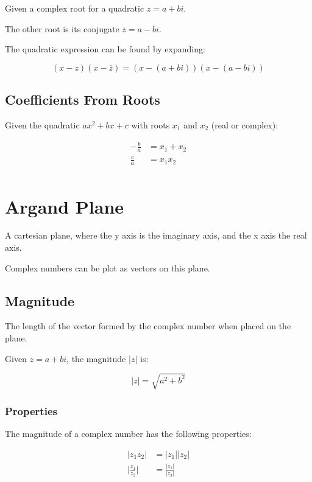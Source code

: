\documentclass[a4paper,11pt]{article}
\begin{document}
Given a complex root for a quadratic $z = a + bi$.

The other root is its conjugate $\overline{z} = a - bi$.

The quadratic expression can be found by expanding:

$$
(x - z)(x - \overline{z}) = (x - (a + bi))(x - (a - bi))
$$


\subsection{Coefficients From Roots}

Given the quadratic $ax^2 + bx + c$ with roots $x_1$ and $x_2$ (real or
complex):

$$
\begin{aligned}
-\frac{b}{a} & = x_1 + x_2 \\
\frac{c}{a} & = x_1 x_2 \\
\end{aligned}
$$




\section{Argand Plane}

A cartesian plane, where the y axis is the imaginary axis, and the x axis the
real axis.

Complex numbers can be plot as vectors on this plane.


\subsection{Magnitude}

The length of the vector formed by the complex number when placed on the plane.

Given $z = a + bi$, the magnitude $\lvert z \rvert$ is:

$$
\lvert z \rvert = \sqrt{a^2 + b^2}
$$


\subsubsection{Properties}

The magnitude of a complex number has the following properties:

$$
\begin{aligned}
\lvert z_1 z_2 \rvert & = \lvert z_1 \rvert \lvert z_2 \rvert \\
\lvert \frac{z_1}{z_2} \rvert & = \frac{\lvert z_1 \rvert}{\lvert z_2 \rvert} \\
\end{aligned}
$$
\end{document}
